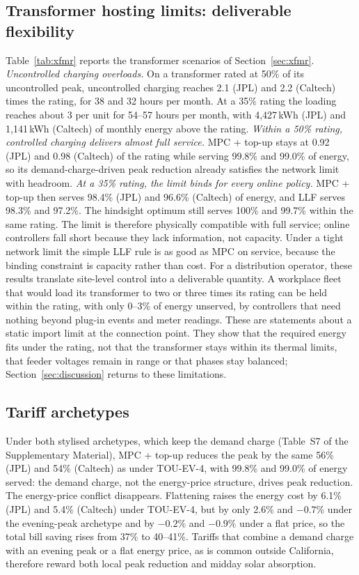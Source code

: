 \subsection{Transformer hosting limits: deliverable flexibility}\label{sec:res:xfmr}
Table~\ref{tab:xfmr} reports the transformer scenarios of Section~\ref{sec:xfmr}.
\emph{Uncontrolled charging overloads.} On a transformer rated at 50\% of its uncontrolled peak, uncontrolled charging reaches 2.1 (JPL) and 2.2 (Caltech) times the rating, for 38 and 32 hours per month. At a 35\% rating the loading reaches about 3 per unit for 54--57 hours per month, with 4,427\,kWh (JPL) and 1,141\,kWh (Caltech) of monthly energy above the rating. \emph{Within a 50\% rating, controlled charging delivers almost full service.} MPC + top-up stays at 0.92 (JPL) and 0.98 (Caltech) of the rating while serving 99.8\% and 99.0\% of energy, so its demand-charge-driven peak reduction already satisfies the network limit with headroom. \emph{At a 35\% rating, the limit binds for every online policy.} MPC + top-up then serves 98.4\% (JPL) and 96.6\% (Caltech) of energy, and LLF serves 98.3\% and 97.2\%. The hindsight optimum still serves 100\% and 99.7\% within the same rating. The limit is therefore physically compatible with full service; online controllers fall short because they lack information, not capacity. Under a tight network limit the simple LLF rule is as good as MPC on service, because the binding constraint is capacity rather than cost.
For a distribution operator, these results translate site-level control into a deliverable quantity. A workplace fleet that would load its transformer to two or three times its rating can be held within the rating, with only 0--3\% of energy unserved, by controllers that need nothing beyond plug-in events and meter readings. These are statements about a static import limit at the connection point. They show that the required energy fits under the rating, not that the transformer stays within its thermal limits, that feeder voltages remain in range or that phases stay balanced; Section~\ref{sec:discussion} returns to these limitations.





\subsection{Tariff archetypes}\label{sec:res:arch}
Under both stylised archetypes, which keep the demand charge (Table~S7 of the Supplementary Material), MPC + top-up reduces the peak by the same 56\% (JPL) and 54\% (Caltech) as under TOU-EV-4, with 99.8\% and 99.0\% of energy served: the demand charge, not the energy-price structure, drives peak reduction. The energy-price conflict disappears. Flattening raises the energy cost by 6.1\% (JPL) and 5.4\% (Caltech) under TOU-EV-4, but by only 2.6\% and $-0.7$\% under the evening-peak archetype and by $-0.2$\% and $-0.9$\% under a flat price, so the total bill saving rises from 37\% to 40--41\%. Tariffs that combine a demand charge with an evening peak or a flat energy price, as is common outside California, therefore reward both local peak reduction and midday solar absorption.

